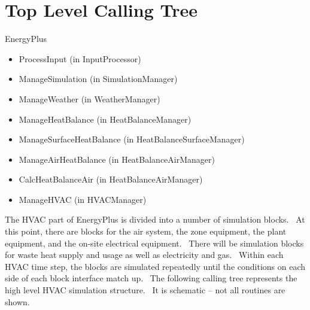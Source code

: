 \section{Top Level Calling Tree}\label{top-level-calling-tree}

EnergyPlus

\begin{itemize}
\item
  ProcessInput (in InputProcessor)
\item
  ManageSimulation (in SimulationManager)
\item
  ManageWeather (in WeatherManager)
\item
  ManageHeatBalance (in HeatBalanceManager)
\item
  ManageSurfaceHeatBalance (in HeatBalanceSurfaceManager)
\item
  ManageAirHeatBalance (in HeatBalanceAirManager)
\item
  CalcHeatBalanceAir (in HeatBalanceAirManager)
\item
  ManageHVAC (in HVACManager)
\end{itemize}

The HVAC part of EnergyPlus is divided into a number of simulation blocks.~ At this point, there are blocks for the air system, the zone equipment, the plant equipment, and the on-site electrical equipment.~ There will be simulation blocks for waste heat supply and usage as well as electricity and gas.~ Within each HVAC time step, the blocks are simulated repeatedly until the conditions on each side of each block interface match up.~ The following calling tree represents the high level HVAC simulation structure.~ It is schematic -- not all routines are shown.
